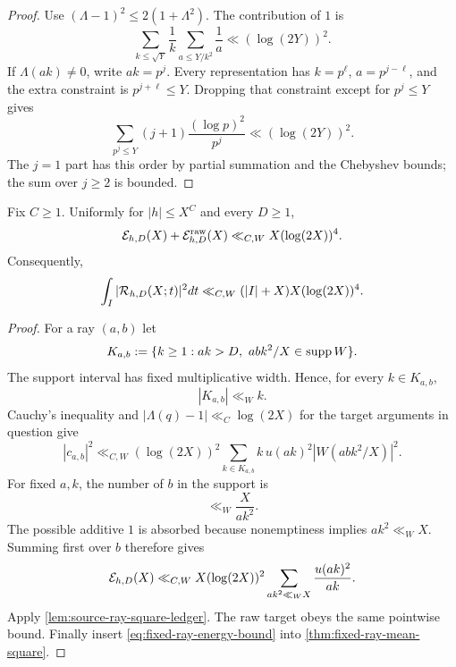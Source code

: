 \begin{proof}
Use $(\Lambda-1)^2\leq2(1+\Lambda^2)$.  The contribution of $1$ is
\[
 \sum_{k\leq\sqrt Y}\frac1k
 \sum_{a\leq Y/k^2}\frac1a
 \ll(\log(2Y))^2.
\]
If $\Lambda(ak)\ne0$, write $ak=p^j$.  Every representation has
$k=p^\ell$, $a=p^{j-\ell}$, and the extra constraint is
$p^{j+\ell}\leq Y$.  Dropping that constraint except for $p^j\leq Y$
gives
\[
 \sum_{p^j\leq Y}(j+1)\frac{(\log p)^2}{p^j}
 \ll(\log(2Y))^2.
\]
The $j=1$ part has this order by partial summation and the Chebyshev
bounds; the sum over $j\geq2$ is bounded.
\end{proof}

\begin{proposition}
\label{prop:fixed-ray-energy-bound}
Fix $C\geq1$.  Uniformly for $|h|\leq X^C$ and every $D\geq1$,
\begin{equation}
 \mathcal E_{h,D}(X)+\mathcal E^{\mathrm{raw}}_{h,D}(X)
 \ll_{C,W}X(\log(2X))^4.
 \label{eq:fixed-ray-energy-bound}
\end{equation}
Consequently,
\begin{equation}
 \int_I|\mathcal R_{h,D}(X;t)|^2dt
 \ll_{C,W}(|I|+X)X(\log(2X))^4.
 \label{eq:fixed-continuum-upper-bound}
\end{equation}
\end{proposition}

\begin{proof}
For a ray $(a,b)$ let
\[
 K_{a,b}:=\{k\geq1:ak>D,\ abk^2/X\in\supp W\}.
\]
The support interval has fixed multiplicative width.  Hence, for every
$k\in K_{a,b}$,
\begin{equation}
 |K_{a,b}|\ll_W k.
 \label{eq:ray-cardinality}
\end{equation}
Cauchy's inequality and $|\Lambda(q)-1|\ll_C\log(2X)$ for the target
arguments in question give
\[
 |c_{a,b}|^2
 \ll_{C,W}(\log(2X))^2
 \sum_{k\in K_{a,b}}k\,u(ak)^2|W(abk^2/X)|^2.
\]
For fixed $a,k$, the number of $b$ in the support is
\begin{equation}
 \ll_W\frac{X}{ak^2}.
 \label{eq:number-of-b-rays}
\end{equation}
The possible additive $1$ is absorbed because nonemptiness implies
$ak^2\ll_W X$.  Summing first over $b$ therefore gives
\[
 \mathcal E_{h,D}(X)
 \ll_{C,W}X(\log(2X))^2
 \sum_{ak^2\ll_W X}\frac{u(ak)^2}{ak}.
\]
Apply \cref{lem:source-ray-square-ledger}.  The raw target obeys the same
pointwise bound.  Finally insert \eqref{eq:fixed-ray-energy-bound} into
\cref{thm:fixed-ray-mean-square}.
\end{proof}

